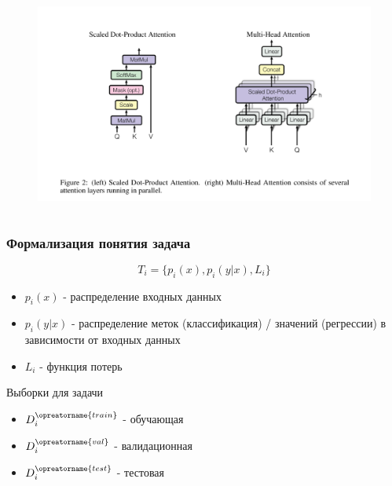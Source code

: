 \documentclass[aspectratio=169]{beamer}
\begin{document}
\begin{frame}
\begin{columns}
\begin{column}{0.8\textwidth}
\begin{figure}
	       		\includegraphics[width=1\textwidth]{assets/mha.png} 
	    	\end{figure}
		\end{column}
	\end{columns}
\end{frame}

\begin{frame}
	\frametitle{Формализация понятия задача}
	\begin{equation}
		T_i = \{p_i(x), p_i(y | x), L_i\}
	\end{equation}
	\begin{itemize}
		\item $p_i(x)$ - распределение входных данных
		\item $p_i(y | x)$ - распределение меток (классификация) / значений (регрессии) в зависимости от входных данных
		\item $L_i$ - функция потерь
	\end{itemize}
	Выборки для задачи
	\begin{itemize}
		\item $D_i^{\opreatorname{train}}$ - обучающая
		\item $D_i^{\opreatorname{val}}$ - валидационная
		\item $D_i^{\opreatorname{test}}$ - тестовая
	\end{itemize}
\end{frame}
\end{document}

